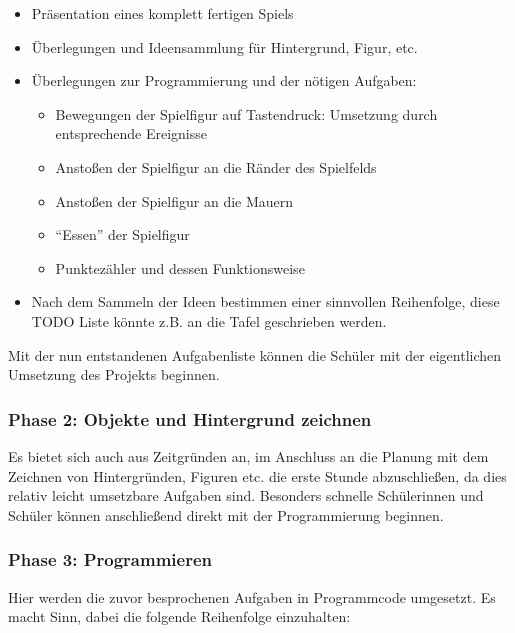 \begin{itemize}
\item
  Präsentation eines komplett fertigen Spiels
\item
  Überlegungen und Ideensammlung für Hintergrund, Figur, etc.
\item
  Überlegungen zur Programmierung und der nötigen Aufgaben:

  \begin{itemize}
  \item
    Bewegungen der Spielfigur auf Tastendruck: Umsetzung durch
    entsprechende Ereignisse
  \item
    Anstoßen der Spielfigur an die Ränder des Spielfelds
  \item
    Anstoßen der Spielfigur an die Mauern
  \item
    ``Essen'' der Spielfigur
  \item
    Punktezähler und dessen Funktionsweise
  \end{itemize}
\item
  Nach dem Sammeln der Ideen bestimmen einer sinnvollen Reihenfolge,
  diese TODO Liste könnte z.B. an die Tafel geschrieben werden.
\end{itemize}

Mit der nun entstandenen Aufgabenliste können die Schüler mit der
eigentlichen Umsetzung des Projekts beginnen.

\subsubsection{Phase 2: Objekte und Hintergrund
zeichnen}\label{phase-2-objekte-und-hintergrund-zeichnen}

Es bietet sich auch aus Zeitgründen an, im Anschluss an die Planung mit
dem Zeichnen von Hintergründen, Figuren etc. die erste Stunde
abzuschließen, da dies relativ leicht umsetzbare Aufgaben sind.
Besonders schnelle Schülerinnen und Schüler können anschließend direkt
mit der Programmierung beginnen.

\subsubsection{Phase 3: Programmieren}\label{phase-3-programmieren}

Hier werden die zuvor besprochenen Aufgaben in Programmcode umgesetzt.
Es macht Sinn, dabei die folgende Reihenfolge einzuhalten:


